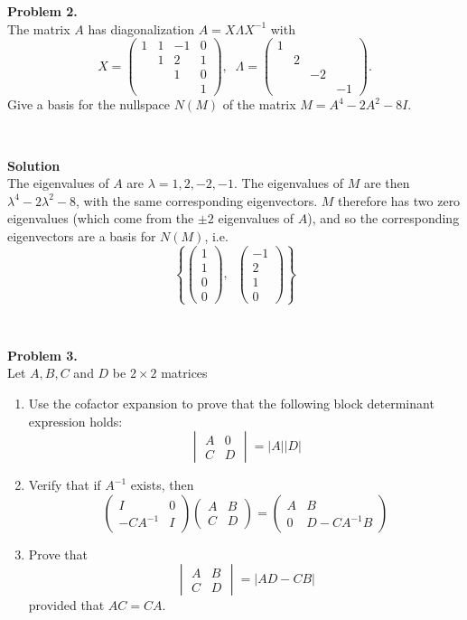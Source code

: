 \documentclass[11pt]{article}
\begin{document}
\noindent \textbf{Problem 2.}\\
The matrix $A$ has diagonalization $A=X\Lambda X^{-1}$ with 
$$X = \begin{pmatrix} 1 & 1 & -1 & 0 \\ & 1 & 2 & 1 \\ & & 1 & 0 \\ & & & 1 \end{pmatrix}, \;\; \Lambda = \begin{pmatrix} 1 & & & \\ & 2 & & \\ & & -2 & \\ & & & -1 \end{pmatrix}.$$
Give a basis for the nullspace $N(M)$ of the matrix $M = A^4 - 2A^2 - 8I$.

\

\noindent \textbf{Solution}\\
The eigenvalues of $A$ are $\lambda = 1, 2, -2, -1$. The eigenvalues of $M$ are then $\lambda^4 - 2\lambda^2 - 8$, with the same corresponding eigenvectors. $M$ therefore has two zero eigenvalues (which come from the $\pm 2$ eigenvalues of $A$), and so the corresponding eigenvectors are a basis for $N(M)$, i.e.
$$\left\{\begin{pmatrix} 1 \\ 1 \\ 0 \\ 0 \end{pmatrix} ,\;\; \begin{pmatrix} -1 \\ 2 \\ 1 \\ 0 \end{pmatrix} \right\}$$

\

\noindent \textbf{Problem 3.}\\
Let $A,B,C$ and $D$ be $2\times 2$ matrices
\begin{enumerate}
\item Use the cofactor expansion to prove that the following block determinant expression holds:
$$\begin{vmatrix} A & 0 \\ C & D \end{vmatrix} = \vert A \vert \vert D \vert$$
\item Verify that if $A^{-1}$ exists, then
$$\begin{pmatrix} I & 0 \\ -CA^{-1} & I \end{pmatrix} \begin{pmatrix} A & B \\ C & D \end{pmatrix}  = \begin{pmatrix} A & B \\ 0 & D-CA^{-1} B\end{pmatrix} $$
\item Prove that
$$ \begin{vmatrix} A & B \\ C & D \end{vmatrix} = \vert AD - C B \vert $$
provided that $AC=CA$. 
\end{enumerate}
\end{document}
